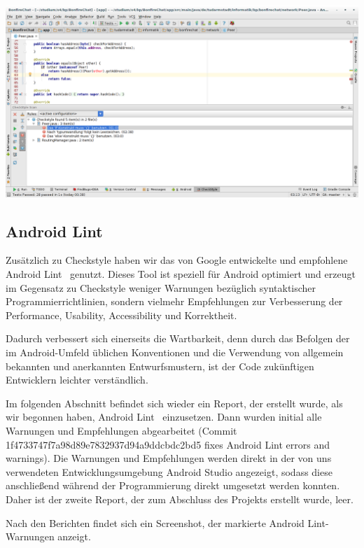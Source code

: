 \includegraphics[width=17.5cm]{belege/checkstyle/checkstyle-idea-screenshot.png}


\clearpage
\subsection{Android Lint}

Zusätzlich zu Checkstyle haben wir das von Google entwickelte und empfohlene \glqq Android Lint\grqq~ genutzt. Dieses Tool ist speziell für Android optimiert und erzeugt im Gegensatz zu Checkstyle weniger Warnungen bezüglich syntaktischer Programmierrichtlinien, sondern vielmehr Empfehlungen zur Verbesserung der Performance, Usability, Accessibility und Korrektheit.

Dadurch verbessert sich einerseits die Wartbarkeit, denn durch das Befolgen der im Android-Umfeld üblichen Konventionen und die Verwendung von allgemein bekannten und anerkannten Entwurfsmustern, ist der Code zukünftigen Entwicklern leichter verständlich.

Im folgenden Abschnitt befindet sich wieder ein Report, der erstellt wurde, als wir begonnen haben, \glqq Android Lint\grqq~ einzusetzen. Dann wurden initial alle Warnungen und Empfehlungen abgearbeitet (Commit 1f4733747f7a98d89e7832937d94a9ddcbdc2bd5 \glqq fixes Android Lint errors and warnings\grqq). Die Warnungen und Empfehlungen werden direkt in der von uns verwendeten Entwicklungsumgebung Android Studio angezeigt, sodass diese anschließend während der Programmierung direkt umgesetzt werden konnten. Daher ist der zweite Report, der zum Abschluss des Projekts erstellt wurde, leer.

Nach den Berichten findet sich ein Screenshot, der markierte Android Lint-Warnungen anzeigt.





